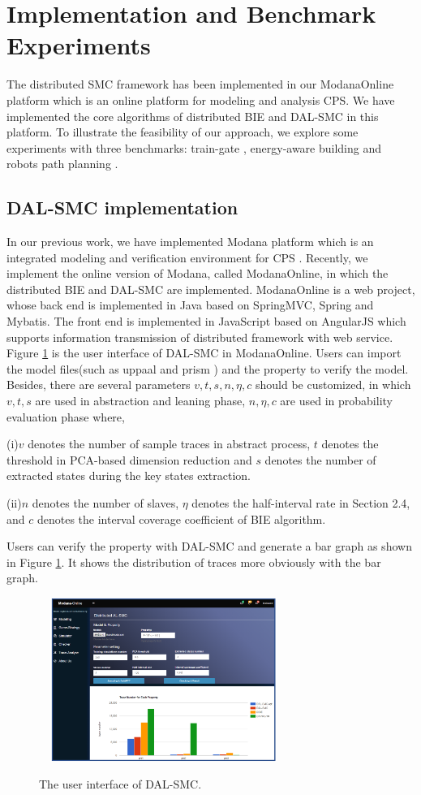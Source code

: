 \section{Implementation and Benchmark Experiments}
The distributed SMC framework has been implemented in our ModanaOnline platform which is an online platform for modeling and analysis CPS. We have implemented the core algorithms of distributed BIE and DAL-SMC in this platform. To illustrate the feasibility of our approach, we explore some experiments with three benchmarks: train-gate \cite{David2015Uppaal}, energy-aware building \cite{david2012evaluation} and robots path planning \cite{Miura2000Modeling}.
\subsection{DAL-SMC implementation}
In our previous work, we have implemented Modana platform which is an integrated modeling and verification environment for CPS \cite{Cheng2015Modana}. Recently, we implement the online version of Modana, called ModanaOnline, in which the distributed BIE and DAL-SMC are implemented. ModanaOnline is a web project, whose back end is implemented in Java based on SpringMVC, Spring and Mybatis. The front end is implemented in JavaScript based on AngularJS which supports information transmission of distributed framework with web service. Figure \ref{ui_dsmc} is the user interface of DAL-SMC in ModanaOnline. Users can import the model files(such as uppaal \cite{Behrmann2006UPPAAL} and prism \cite{Kwiatkowska2002PRISM}) and the property to verify the model. Besides, there are several parameters $v,t,s,n,\eta,c$ should be customized, in which $v,t,s$ are used in abstraction and leaning phase, $n,\eta,c$ are used in probability evaluation phase where,

(i)$v$ denotes the number of sample traces in abstract process, $t$ denotes the threshold in PCA-based dimension reduction and $s$ denotes the number of extracted states during the key states extraction.

(ii)$n$ denotes the number of slaves, $\eta$ denotes the half-interval rate in Section 2.4, and $c$ denotes the interval coverage coefficient of BIE algorithm.

Users can verify the property with DAL-SMC and generate a bar graph as shown in Figure \ref{ui_dsmc}. It shows the distribution of traces more obviously with the bar graph.
\begin{figure}[htbp]
	\centering
	{\includegraphics[width=3.2in,height=2.1in]{fig/system.png}}
	\caption{The user interface of DAL-SMC.}\label{ui_dsmc}
\end{figure}
